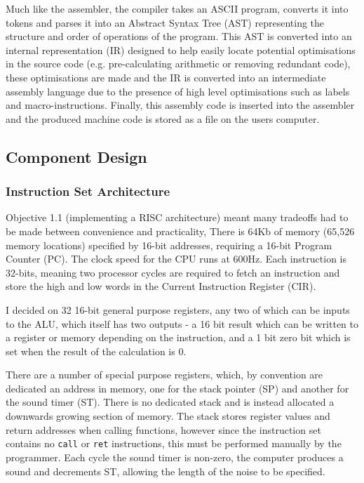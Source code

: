 \begin{samepage}

Much like the assembler, the compiler takes an ASCII program, converts it into tokens and parses it into an Abstract Syntax Tree (AST) representing the structure and order of operations of the program. This AST is converted into an internal representation (IR) designed to help easily locate potential optimisations in the source code (e.g. pre-calculating arithmetic or removing redundant code), these optimisations are made and the IR is converted into an intermediate assembly language due to the presence of high level optimisations such as labels and macro-instructions. Finally, this assembly code is inserted into the assembler and the produced machine code is stored as a file on the users computer. 

\end{samepage}

\bigskip

\subsection{Component Design}
\subsubsection{Instruction Set Architecture}

Objective 1.1 (implementing a RISC architecture) meant many tradeoffs had to be made between convenience and practicality, There is 64Kb of memory (65,526 memory locations) specified by 16-bit addresses, requiring a 16-bit Program Counter (PC). The clock speed for the CPU runs at 600Hz. Each instruction is 32-bits, meaning two processor cycles are required to fetch an instruction and store the high and low words in the Current Instruction Register (CIR). 

I decided on 32 16-bit general purpose registers, any two of which can be inputs to the ALU, which itself has two outputs - a 16 bit result which can be written to a register or memory depending on the instruction, and a 1 bit zero bit which is set when the result of the calculation is 0. 

There are a number of special purpose registers, which, by convention are dedicated an address in memory, one for the stack pointer (SP) and another for the sound timer (ST). There is no dedicated stack and is instead allocated a downwards growing section of memory. The stack stores register values and return addresses when calling functions, however since the instruction set contains no \texttt{call} or \texttt{ret} instructions, this must be performed manually by the programmer. Each cycle the sound timer is non-zero, the computer produces a sound and decrements ST, allowing the length of the noise to be specified.


